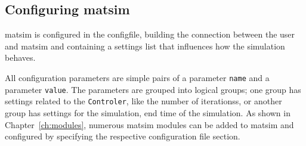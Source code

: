 \subsection{Configuring \protect\gls{matsim}}
\label{sec:lgs-config}
 \gls{matsim} is configured 
 in the \gls{configfile}, building the connection between the user and \gls{matsim} and containing a settings list that influences how the simulation behaves.
%
%

All configuration parameters are simple pairs of a \gls{parameter} \lstinline|name| and a \gls{parameter} \lstinline|value|. The \glspl{parameter} are grouped into logical groups; one group has settings related to the \lstinline|Controler|, like the number of \glspl{iteration}s, or another group has settings for the \gls{simulation}, \eg end time of the simulation. As shown in Chapter~\ref{ch:modules}, numerous \gls{matsim} modules can be added to \gls{matsim} and configured by specifying the respective configuration file section.

